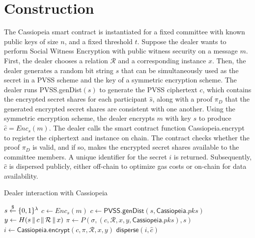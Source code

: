 \section{Construction}\label{construction:without_incentives}
The Cassiopeia smart contract is instantiated for a fixed committee with known public keys of size $n$, and a fixed threshold $t$.
Suppose the dealer wants to perform Social Witness Encryption with public witness security on a message $m$.
First, the dealer chooses a relation $\mathcal{R}$ and a corresponding instance $x$.
Then, the dealer generates a random bit string $s$ that can be simultaneously used as the secret in a PVSS scheme and the key of a symmetric encryption scheme. %
The dealer runs \textsf{PVSS.genDist}$(s)$ to generate the PVSS ciphertext $c$, which contains the encrypted secret shares for each participant $\hat{s}$, along with a proof $\pi_D$ that the generated encrypted secret shares are consistent with one another.
Using the symmetric encryption scheme, the dealer encrypts $m$ with key $s$ to produce $\hat{c} = Enc_s(m)$.
The dealer calls the smart contract function \textsf{Cassiopeia.encrypt} to register the ciphertext and instance on chain.
The contract checks whether the proof $\pi_D$ is valid, and if so, makes the encrypted secret shares available to the committee members. 
A unique identifier for the secret $i$ is returned.
Subsequently, $\hat{c}$ is dispersed publicly, either off-chain to optimize gas costs or on-chain for data availability.

\begin{algorithm}[H]
\caption{Dealer interaction with Cassiopeia}
\label{dealer_alg_no_incentives}
    \begin{algorithmic}[1]
            \State $s \overset{\$}{\gets} \{0,1\}^{\lambda}$
            \State $\hat{c} \gets Enc_s(m)$
            \State $c \gets \textsf{PVSS.genDist}(s, \textsf{Cassiopeia}.pks)$
            \State $y \gets H(s \,\|\, c \,\|\, \mathcal{R} \,\|\, x)$
            \State $\pi \gets P(\sigma, (c, \mathcal{R}, x, y, \textsf{Cassiopeia}.pks), s)$
            \State $i \gets \textsf{Cassiopeia.encrypt}(c, \pi, \mathcal{R}, x, y)$
            \State $\textsf{disperse}(i, \hat{c})$ %
        \EndOn
    \end{algorithmic}
\end{algorithm}

